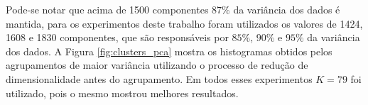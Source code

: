 \documentclass[conference]{IEEEtran}
\begin{document}
Pode-se notar que acima de 1500 componentes $87\%$  da variância dos dados é mantida, para os experimentos deste trabalho foram utilizados os valores de 1424, 1608 e 1830 componentes, que são responsáveis por $85\%$, $90\%$ e $95\%$ da variância dos dados. A Figura \ref{fig:clusters_pca} mostra os histogramas obtidos pelos agrupamentos de maior variância utilizando o processo de redução de dimensionalidade antes do agrupamento. Em todos esses experimentos $K = 79$ foi utilizado, pois o mesmo mostrou melhores resultados.


\begin{figure}[!h]
	\centering
	\smallskip
	\smallskip
	{
		{
			\setlength{\fboxsep}{1pt}
			\setlength{\fboxrule}{1pt}
}}
\end{figure}
\end{document}
